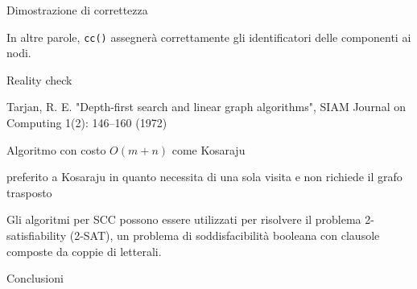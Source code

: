 \begin{frame}{Dimostrazione di correttezza}


\bigskip
In altre parole, \texttt{cc()} assegnerà correttamente gli identificatori delle
componenti ai nodi.
\end{frame}    

\begin{frame}{Reality check}

\vspace{-9pt}
\begin{myboxtitle}
\BIL
\item Tarjan, R. E. "Depth-first search and linear graph algorithms", SIAM Journal on Computing 1(2): 146–160 (1972)
\item Algoritmo con costo $O(m+n)$ come Kosaraju
\item \EE preferito a Kosaraju in quanto necessita di una sola visita e non richiede il grafo trasposto
\EIL
\end{myboxtitle}

\begin{myboxtitle}[Applicazioni]
Gli algoritmi per SCC possono essere utilizzati per risolvere il problema
\alert{2-satisfiability} (\alert{2-SAT}), un problema di soddisfacibilità booleana con 
clausole composte da coppie di letterali.
\end{myboxtitle}

\end{frame}

\begin{frame}{Conclusioni}

\vspace{-6pt}

\end{frame}


